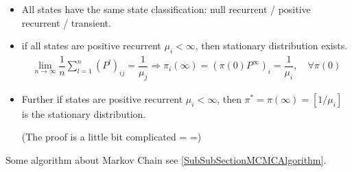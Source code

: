 \begin{itemize}[topsep=2pt,itemsep=0pt]
    \item All states have the same state classification: null recurrent / positive recurrent / transient.
    \item if all states are positive recurrent $ \mu _i<\infty $, then stationary distribution exists.
    \begin{align*}
        \lim_{n\to \infty}\dfrac{1}{n}\sum_{l=1}^n(P^l)_{ij}=\dfrac{1}{\mu _j}\Rightarrow \pi_i(\infty)=(\pi(0)P^\infty)_i= \dfrac{1}{\mu _i},\quad \forall \pi(0)
    \end{align*}
    \item Further if states are positive recurrent $ \mu _i<\infty $, then $ \pi^*=\pi(\infty)=[1/\mu _i] $ is the stationary distribution.

    (The proof is a little bit complicated = =)
    
\end{itemize}

Some algorithm about Markov Chain see \autoref{SubSubSectionMCMCAlgorithm}.


